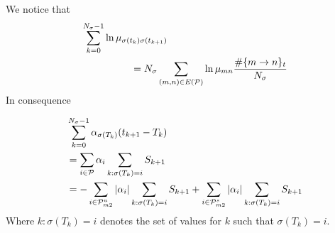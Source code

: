 \documentclass[twocolumn]{autart}    %
\begin{document}
\begin{pf}
    We notice that
    \begin{equation}
        \begin{aligned}
            \setlength{\arraycolsep}{0.9pt}
            &\sum_{k = 0}^{N_{\sigma}-1}\ln \mu_{\sigma(t_{k})\sigma(t_{k+1})} \\%
            &\quad \quad \quad \quad \quad =N_{\sigma}\sum_{(m,n)\in E(\mathcal{P})}\ln \mu_{mn} \frac{\#\{m \rightarrow n\}_{t}}{N_{\sigma}}
        \end{aligned}
    \end{equation}
    In consequence
    
    \begin{equation}
        \begin{aligned}
            \setlength{\arraycolsep}{0.9pt}
            & \sum_{k=0}^{N_{\sigma}-1}\alpha_{\sigma(T_{k})}(t_{k+1}-T_{k})\\
            &= \sum_{i \in \mathcal{P}}\alpha_{i}\sum_{k:\sigma(T_{k}) = i}S_{k+1}\\
            &= -\sum_{i \in \mathcal{P}_{m2}^{u}}\left|\alpha_{i}\right|\sum_{k:\sigma(T_{k})=i}S_{k+1} + \sum_{i \in \mathcal{P}_{m2}^{s}}\left|\alpha_{i}\right|\sum_{k:\sigma(T_{k})=i}S_{k+1} 
        \end{aligned}
    \end{equation}
    Where $k:\sigma(T_{k}) = i$ denotes the set of values for $k$ such that $\sigma(T_{k}) = i$.


\end{pf}
\end{document}
